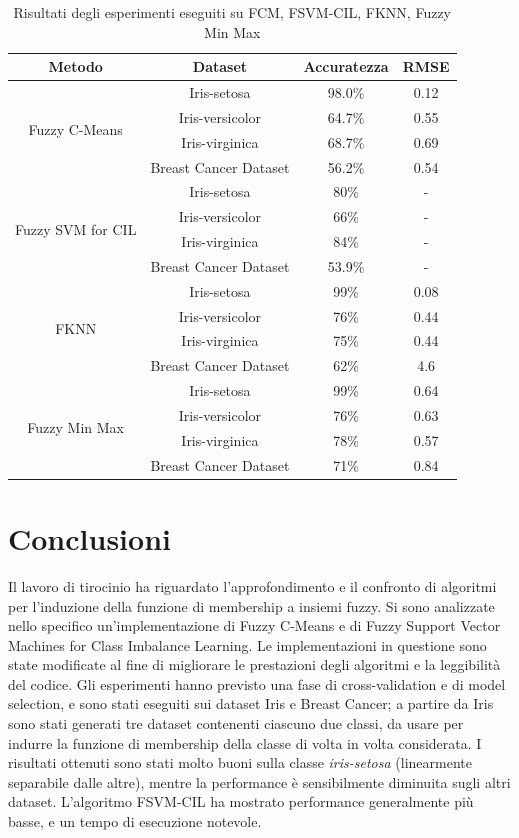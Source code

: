 \documentclass[oneside, openany]{book}
\begin{document}
		\begin{table}[h]
		\caption{Risultati degli esperimenti eseguiti su FCM, FSVM-CIL, FKNN, Fuzzy Min Max}
		\begin{center}\begin{tabular}{ |c|c|c|c| } 
				\hline
				\textbf{Metodo} & \textbf{Dataset} & \textbf{Accuratezza} & \textbf{RMSE}\\
				\hline
				\multirow{4}{4em}{Fuzzy C-Means} 
				& Iris-setosa & 98.0\% & 0.12\\
				&Iris-versicolor & 64.7\% & 0.55\\
				&Iris-virginica & 68.7\% & 0.69\\
				&Breast Cancer Dataset &  56.2\% & 0.54\\
				\hline
				\multirow{4}{4em}{Fuzzy SVM for CIL}
				&Iris-setosa & 80\% & -\\
				&Iris-versicolor & 66\% & -\\
				&Iris-virginica & 84\% & -\\
				&Breast Cancer Dataset &  53.9\% & -\\	
				\hline							
				\multirow{4}{4em}{FKNN}
				&Iris-setosa & 99\% & 0.08 \\
				&Iris-versicolor & 76\% & 0.44 \\
				&Iris-virginica & 75\% & 0.44 \\
				&Breast Cancer Dataset & 62\% & 4.6 \\
				\hline
				\multirow{4}{4em}{Fuzzy Min Max}
				&Iris-setosa & 99\% & 0.64 \\
				&Iris-versicolor & 76\% & 0.63 \\
				&Iris-virginica & 78\% & 0.57 \\
				&Breast Cancer Dataset & 71\%  & 0.84 \\
				\hline           				
			\end{tabular}
		\end{center}
		\label{tab:res}	
		\end{table}

	\chapter*{Conclusioni}
	Il lavoro di tirocinio ha riguardato l'approfondimento e il confronto di algoritmi per l'induzione della funzione di membership a insiemi fuzzy. Si sono analizzate nello specifico un'implementazione di Fuzzy C-Means e di Fuzzy Support Vector Machines for Class Imbalance Learning. Le implementazioni in questione sono state modificate al fine di migliorare le prestazioni degli algoritmi e la leggibilità del codice. Gli esperimenti hanno previsto una fase di cross-validation e di model selection, e sono stati eseguiti sui dataset Iris e Breast Cancer; a partire da Iris sono stati generati tre dataset contenenti ciascuno due classi, da usare per indurre la funzione di membership della classe di volta in volta considerata. I risultati ottenuti sono stati molto buoni sulla classe \textit{iris-setosa} (linearmente separabile dalle altre), mentre la performance è sensibilmente diminuita sugli altri dataset. L'algoritmo FSVM-CIL ha mostrato performance generalmente più basse, e un tempo di esecuzione notevole.
	
\end{document}
